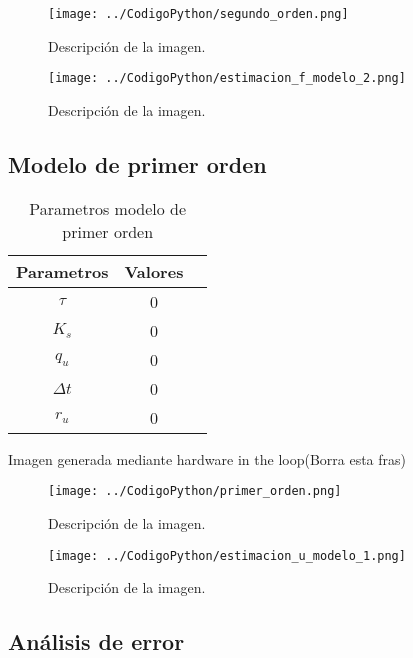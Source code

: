 \documentclass[conference]{IEEEtran}
\begin{document}
\begin{figure}[h]
	\centering
	\texttt{[image: ../CodigoPython/segundo\_orden.png]}
	\caption{Descripción de la imagen.}
	\label{fig:etiqueta}
\end{figure}

\begin{figure}[h]
	\centering
	\texttt{[image: ../CodigoPython/estimacion\_f\_modelo\_2.png]}
	\caption{Descripción de la imagen.}
	\label{fig:etiqueta}
\end{figure}


\subsection{Modelo de primer orden}

\begin{table}[h]
	\centering
	\caption{Parametros modelo de primer orden}
	\label{tab:parametros_primer_orden}
	\begin{tabular}{|c|c|c|}
		\hline
		\textbf{Parametros} & \textbf{Valores} \\
		\hline
		$\tau$  &  0 \\
		$K_s$      & 0 \\
		$q_u$ & 0 \\
		$\Delta t$ & 0\\  
		$r_u$ & 0 \\ 
		\hline
	\end{tabular}
	
\end{table}

Imagen generada mediante hardware in the loop(Borra esta fras)


\begin{figure}[h]
	\centering
	\texttt{[image: ../CodigoPython/primer\_orden.png]}
	\caption{Descripción de la imagen.}
	\label{fig:etiqueta}
\end{figure}

\begin{figure}[h]
	\centering
	\texttt{[image: ../CodigoPython/estimacion\_u\_modelo\_1.png]}
	\caption{Descripción de la imagen.}
	\label{fig:etiqueta}
\end{figure}

\subsection{An\'alisis de error} 
\end{document}
